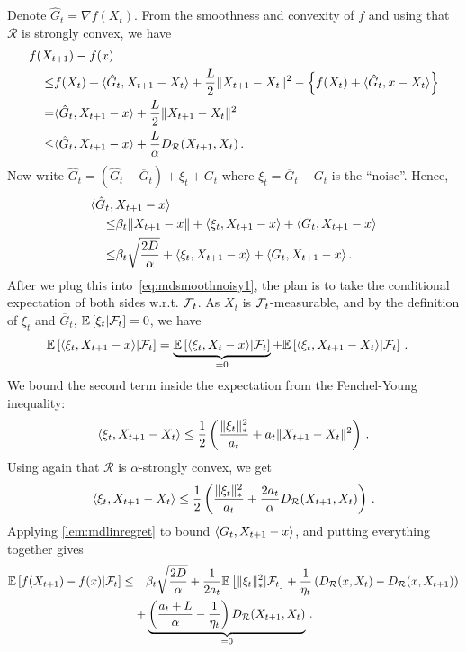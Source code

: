 Denote $\hat{G}_t = \nabla f(X_t)$. 
From the smoothness and convexity of $f$ and using that $\mathcal{R}$ is strongly convex, we have
\begin{align}
\MoveEqLeft
f(X_{t+1}) - f(x) \nonumber\\
 \le& f(X_t) + \ip{ \hat{G}_t, X_{t+1}-X_t } + \frac{L}{2} \norm{X_{t+1}-X_t}^2 - \left\{ f(X_t) + \ip{ \hat{G}_t, x-X_t} \right\} \nonumber \\
 =& \ip{\hat{G}_t, X_{t+1} - x } +  \frac{L}{2} \norm{X_{t+1}-X_t}^2 \nonumber\\
 \le& \ip{\hat{G}_t,X_{t+1}-x} + \frac{L}{\alpha} D_{\mathcal{R}}(X_{t+1},X_t)\,. \label{eq:mdsmoothnoisy1}
\end{align}
Now write $\hat{G}_t = (\hat{G}_t-\overline G_t)  + \xi_t + G_t$ where $\xi_t = \overline G_t - G_t$ is the ``noise''.
Hence, 
\begin{align*}
\MoveEqLeft
\ip{\hat{G}_t,X_{t+1}-x} \\
\le& \beta_t \norm{X_{t+1}-x} + \ip{\xi_t,X_{t+1}-x} + \ip{ G_t, X_{t+1} - x }\\
\le &\beta_t \sqrt{ \frac{2D}{\alpha} } + \ip{\xi_t,X_{t+1}-x} + \ip{ G_t, X_{t+1} - x } \,.
\end{align*}
After we plug this into~\eqref{eq:mdsmoothnoisy1},
the plan is to take the conditional expectation of both sides w.r.t. $\mathcal{F}_{t}$.
As $X_t$ is $\mathcal{F}_{t}$-measurable, and by the definition of $\xi_t$ and $\overline G_t$, $\mathbb{E}\left[ \xi_t|\mathcal{F}_{t}\right] = 0$, 
we have 
\begin{align*}
\MoveEqLeft
\EE{\ip{\xi_t, X_{t+1}-x}|\F_{t}} = \underbrace{\EE{\ip{\xi_t,X_{t}-x}|\F_{t}}}_{=0} + \EE{\ip{\xi_t,X_{t+1}-X_t}|\F_{t}} \,.
\end{align*}
We bound the second term inside the expectation from the Fenchel-Young inequality: 
\begin{align*}
\langle \xi_t,X_{t+1}-X_t \rangle \le \frac12 \left(\frac{\|\xi_t\|_*^2}{a_t} + a_t \|X_{t+1}-X_t\|^2\right)\,.
\end{align*}
Using again that $\mathcal{R}$ is $\alpha$-strongly convex, we get 
\[
\langle \xi_t,X_{t+1}-X_t \rangle \le \frac12 \left(\frac{\|\xi_t\|_*^2}{a_t} + \frac{2a_t}{\alpha} D_{\mathcal{R}}(X_{t+1},X_t) \right)\,.
\]
Applying 
\cref{lem:mdlinregret} 
to bound $\langle  G_t, X_{t+1} - x  \rangle$, and putting everything together gives
\begin{align*}
 \mathbb{E}\left[f(X_{t+1}) - f(x) |\mathcal{F}_{t} \right]
\le & \quad
 \beta_t \sqrt{ \frac{2D}{\alpha} }+
\frac{1}{2a_t}  \mathbb{E}\left[\|\xi_t\|_*^2|\mathcal{F}_{t}\right]+
\frac{1}{\eta_t} \left(D_{\mathcal{R}}(x,X_t)-D_{\mathcal{R}}(x,X_{t+1})\right) \\&+
\underbrace{\left(\frac{a_t+L}{\alpha}-\frac{1}{\eta_t}\right) D_{\mathcal{R}}(X_{t+1},X_t)}_{=0} \,.
\end{align*}
